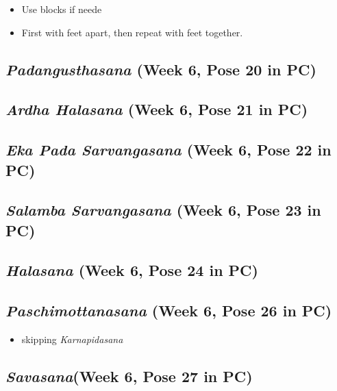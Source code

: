 \documentclass{book}
\newcommand{\apose}[1]{\emph{#1}}
\newcommand{\ardhal}{\apose{Ardha Halasana}}
\newcommand{\ekapadsarv}{\apose{Eka Pada Sarvangasana}}
\newcommand{\hal}{\apose{Halasana}}
\newcommand{\karn}{\apose{Karnapidasana}}
\newcommand{\padang}{\apose{Padangusthasana}}
\newcommand{\paschi}{\apose{Paschimottanasana}}
\newcommand{\sarv}{\apose{Salamba Sarvangasana}}
\newcommand{\sav}{\apose{Savasana}}
\newcommand{\PC}[2]{{\normalfont \hfill(Week #1, Pose #2 in PC)}}
\newcounter{pose}
\newcommand{\pose}{\subsection}
\begin{document}
  \begin{itemize}
  \item Use blocks if neede
  \item First with feet apart, then repeat with feet together.
  \end{itemize}

\pose{ \padang{}  \PC{6}{20}}

\pose{ \ardhal{}  \PC{6}{21}}

\pose{ \ekapadsarv{}  \PC{6}{22}}

\pose{ \sarv{}  \PC{6}{23}}

\pose{ \hal{}  \PC{6}{24}}

\pose{ \paschi{}  \PC{6}{26}}

  \begin{itemize}
  \item skipping \karn{}
  \end{itemize}

\pose{ \sav  \PC{6}{27}}




\end{document}
